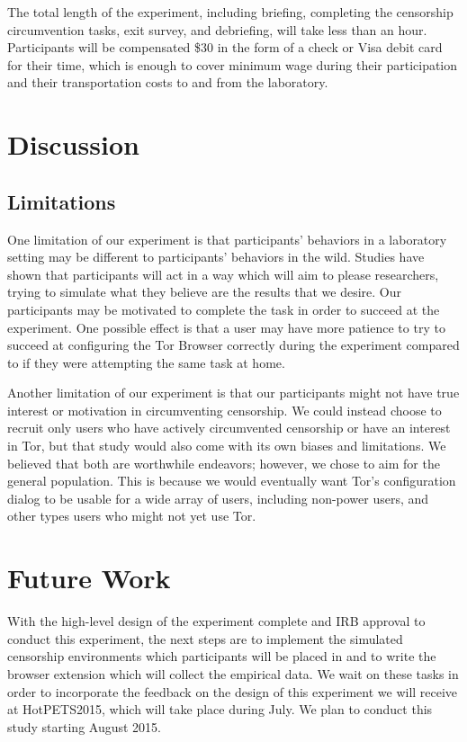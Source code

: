 \documentclass[letterpaper,twocolumn,11pt]{article}
\begin{document}
The total length of the experiment, including briefing, completing the censorship circumvention tasks, 
exit survey, and debriefing, will take less than an hour. Participants will be compensated \$30 in the form
of a check or Visa debit card for their time, which is enough to cover minimum wage during their participation 
and their transportation costs to and from the laboratory. 

\section{Discussion} 

\subsection{Limitations}
\indent \indent One limitation of our experiment is that participants' behaviors in a laboratory setting may
be different to participants' behaviors in the wild. Studies have shown that participants will act in a way which 
will aim to please researchers, trying to simulate what they believe are the results that we desire. Our participants
may be motivated to complete the task in order to succeed at the experiment. One possible effect is that a user
may have more patience to try to succeed at configuring the Tor Browser correctly during the experiment 
compared to if they were attempting the same task at home. 

Another limitation of our experiment is that our participants might not have true interest or motivation in
circumventing censorship. We could instead choose to recruit only users who have actively circumvented
censorship or have an interest in Tor, but that study would also come with its own biases and limitations.
We believed that both are worthwhile endeavors; however, we chose to aim for the general population. 
This is because we would eventually want Tor's configuration dialog to be usable for a wide array of users, 
including non-power users, and other types users who might not yet use Tor. 

\section{Future Work}
\indent \indent With the high-level design of the experiment complete and IRB approval  to conduct this
experiment,  the next steps are to implement the simulated censorship environments which participants 
will be placed in and to write the browser extension which will collect the empirical data. 
We wait on these tasks in order to incorporate the feedback on the design of this experiment 
we will receive at HotPETS2015, which will take place during July. We plan to conduct this study starting 
August 2015. 
\end{document}
